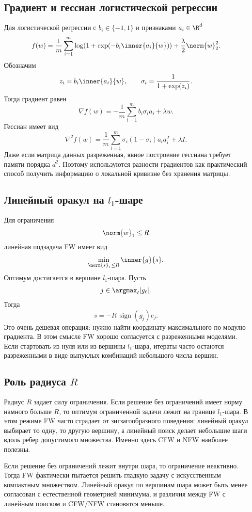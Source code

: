 \subsection{Градиент и гессиан логистической регрессии}

Для логистической регрессии с $b_i\in\{-1,1\}$ и признаками $a_i\in\R^d$
\[
    f(w)=
    \frac{1}{m}\sum_{i=1}^{m}
    \log(1+\exp(-b_i\inner{a_i}{w}))
    +
    \frac{\lambda}{2}\norm{w}_2^2.
\]
Обозначим
\[
    z_i=b_i\inner{a_i}{w},
    \qquad
    \sigma_i=\frac{1}{1+\exp(z_i)}.
\]
Тогда градиент равен
\[
    \nabla f(w)
    =
    -\frac{1}{m}\sum_{i=1}^{m}b_i\sigma_i a_i
    +
    \lambda w.
\]
Гессиан имеет вид
\[
    \nabla^2 f(w)
    =
    \frac{1}{m}
    \sum_{i=1}^{m}
    \sigma_i(1-\sigma_i)a_i a_i^T
    +
    \lambda I.
\]
Даже если матрица данных разреженная, явное построение гессиана требует памяти порядка
$d^2$.
Поэтому используются разности градиентов как практический способ получить информацию
о локальной кривизне без хранения матрицы.

\subsection{Линейный оракул на $l_1$-шаре}

Для ограничения
\[
    \norm{w}_1\leq R
\]
линейная подзадача FW имеет вид
\[
    \min_{\norm{s}_1\leq R}\inner{g}{s}.
\]
Оптимум достигается в вершине $l_1$-шара.
Пусть
\[
    j\in\argmax_{\ell}|g_\ell|.
\]
Тогда
\[
    s=-R\,\operatorname{sign}(g_j)e_j.
\]
Это очень дешевая операция: нужно найти координату максимального по модулю градиента.
В этом смысле FW хорошо согласуется с разреженными моделями.
Если стартовать из нуля или из вершины $l_1$-шара, итераты часто остаются разреженными
в виде выпуклых комбинаций небольшого числа вершин.

\subsection{Роль радиуса $R$}

Радиус $R$ задает силу ограничения.
Если решение без ограничений имеет норму намного больше $R$, то оптимум ограниченной задачи
лежит на границе $l_1$-шара.
В этом режиме FW часто страдает от зигзагообразного поведения: линейный оракул выбирает
то одну, то другую вершину, а линейный поиск делает небольшие шаги вдоль ребер допустимого
множества.
Именно здесь CFW и NFW наиболее полезны.

Если решение без ограничений лежит внутри шара, то ограничение неактивно.
Тогда FW фактически пытается решить гладкую задачу с искусственным компактным множеством.
Линейный оракул по вершинам шара может быть менее согласован с естественной геометрией
минимума, и различия между FW с линейным поиском и CFW/NFW становятся меньше.

